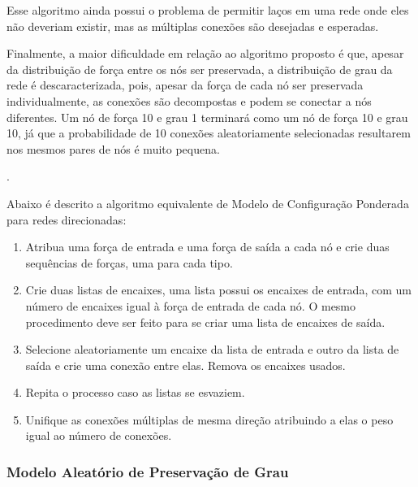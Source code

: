 \documentclass[12pt,a4paper]{article}
\theoremstyle{hypo}
\begin{document}
Esse algoritmo ainda possui o problema de permitir laços em uma rede onde eles não deveriam existir, mas as múltiplas conexões são desejadas e esperadas.

Finalmente, a maior dificuldade em relação ao algoritmo proposto é que, apesar da distribuição de força entre os nós ser preservada, a distribuição de grau da rede é descaracterizada, pois, apesar da força de cada nó ser preservada individualmente, as conexões são decompostas e podem se conectar a nós diferentes. Um nó de força 10 e grau 1 terminará como um nó de força 10 e grau 10, já que a probabilidade de 10 conexões aleatoriamente selecionadas resultarem nos mesmos pares de nós é muito pequena.

.

Abaixo é descrito a algoritmo equivalente de Modelo de Configuração Ponderada para redes direcionadas:

\begin{enumerate}
\item Atribua uma força de entrada e uma força de saída a cada nó e crie duas sequências de forças, uma para cada tipo.
\item Crie duas listas de encaixes, uma lista possui os encaixes de entrada, com um número de encaixes igual à força de entrada de cada nó. O mesmo procedimento deve ser feito para se criar uma lista de encaixes de saída.
\item Selecione aleatoriamente um encaixe da lista de entrada e outro da lista de saída e crie uma conexão entre elas. Remova os encaixes usados.
\item Repita o processo caso as listas se esvaziem.
\item Unifique as conexões múltiplas de mesma direção atribuindo a elas o peso igual ao número de conexões.
\end{enumerate}


\subsubsection{Modelo Aleatório de Preservação de Grau} \label{sec:modelo-preservacao-grau}
\end{document}
